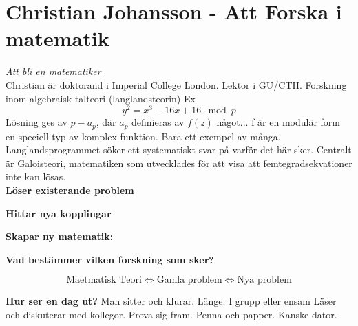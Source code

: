 \chapter{Christian Johansson - Att Forska i matematik}
\textit{Att bli en matematiker}\\

\noindent Christian är doktorand i Imperial College London. Lektor i GU/CTH. Forskning inom algebraisk talteori (langlandsteorin)
Ex
$$y^2=x^3-16x+16 \mod{p}$$
Lösning ges av $p-a_p$, där $a_p$ definieras av
$f(z)$ något...
f är en modulär form \textemdash en speciell typ av komplex funktion.
Bara ett exempel av många. \\Langlandsprogrammet söker ett systematiskt svar på varför det här sker.
Centralt är Galoisteori, matematiken som utvecklades för att visa att femtegradsekvationer inte kan lösas.\\
\textbf{Löser existerande problem}

\textbf{Hittar nya kopplingar}

\textbf{Skapar ny matematik:}

\textbf{Vad bestämmer vilken forskning som sker?}

$$\text{Maetmatisk Teori}\iff \text{Gamla problem} \iff \text{Nya problem}$$

\textbf{Hur ser en dag ut?}
Man sitter och klurar. Länge. I grupp eller ensam
Läser och diskuterar med kollegor. Prova sig fram. Penna och papper. Kanske dator.

